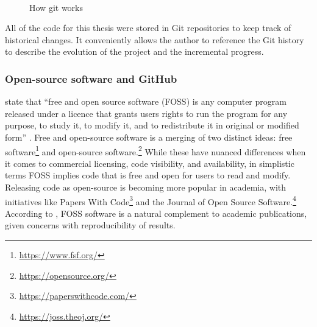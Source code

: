 \documentclass[report.tex]{subfiles}
\begin{document}
\begin{figure}[ht]
	\centering
	\\
	\caption{How git works \parencite[6, 8]{gitbook}}
	\label{fig:git}
\end{figure}

All of the code for this thesis were stored in Git repositories to keep track of historical changes. It conveniently allows the author to reference the Git history to describe the evolution of the project and the incremental progress.

\subsubsection{Open-source software and GitHub}
\label{sec:ossgithub}

\citeauthor{floss} state that ``free and open source software (FOSS) is any computer program released under a licence that grants users rights to run the program for any purpose, to study it, to modify it, and to redistribute it in original or modified form'' \parencite[1]{floss}. Free and open-source software is a merging of two distinct ideas: free software\footnote{\url{https://www.fsf.org/}} and open-source software.\footnote{\url{https://opensource.org/}} While these have nuanced differences when it comes to commercial licensing, code visibility, and availability, in simplistic terms FOSS implies code that is free and open for users to read and modify. Releasing code as open-source is becoming more popular in academia, with initiatives like Papers With Code\footnote{\url{https://paperswithcode.com/}} and the Journal of Open Source Software.\footnote{\url{https://joss.theoj.org/}} According to \textcite{floss}, FOSS software is a natural complement to academic publications, given concerns with reproducibility of results.
\end{document}
